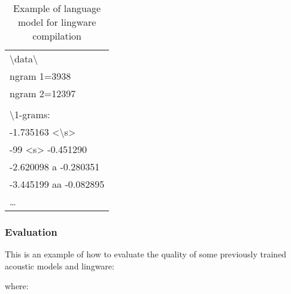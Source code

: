 \documentclass[11pt,a4paper,titlepage,twoside]{article}
\begin{document}
\begin{table}[htb!]
  \scriptsize
  \centering
  \begin{tabular}{|l|}
    \hline
    \textbackslash{}data\textbackslash{} \\
    ngram 1=3938 \\
    ngram 2=12397 \\
    \\
    \textbackslash{}1-grams: \\
    -1.735163	\textless{}\textbackslash{}s\textgreater{} \\
    -99	\textless{}s\textgreater{}	-0.451290 \\
    -2.620098	a	-0.280351 \\
    -3.445199	aa	-0.082895 \\
    \ldots \\
    \hline
  \end{tabular}
  \caption{Example of language model for lingware compilation}
  \label{tab:example-lm}
\end{table}

\subsubsection{Evaluation}
\label{sec:evaluation}

This is an example of how to evaluate the quality of some previously trained acoustic models and lingware:

\begin{center}
  \scriptsize
\end{center}

where:
\end{document}
